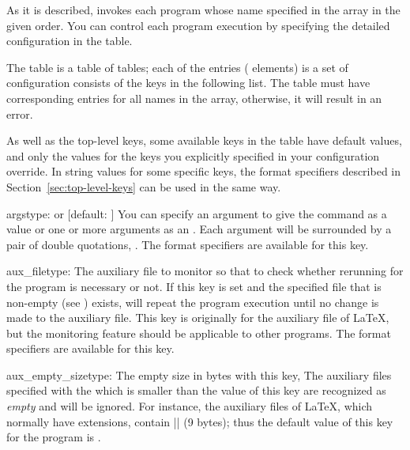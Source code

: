 \documentclass{llmk-doc}
\begin{document}
As it is described,  invokes each program whose name specified in
the  array in the given order. You can control each program
execution by specifying the detailed configuration in the 
table.

The  table is a table of tables; each of the entries (\aka
elements) is a set of configuration consists of the keys in the following list.
The  table must have corresponding entries for all names in the
 array, otherwise, it will result in an error.

As well as the top-level keys, some available keys in the  table
have default values, and only the values for the keys you explicitly specified
in your configuration override. In string values for some specific keys, the
format specifiers described in Section~\ref{sec:top-level-keys} can be used in
the same way.

\begin{confkey}{args}{type:  or }
  [default: \code{["\%T"]}]
You can specify an argument to give the command as a  value or one
or more arguments as an . Each argument will be
surrounded by a pair of double quotations, \eg {}. The format
specifiers are available for this key.
\end{confkey}

\begin{confkey}{aux\_file}{type: }
The auxiliary file to monitor so that to check whether rerunning for the
program is necessary or not. If this key is set and the specified file that is
non-empty (see ) exists,  will repeat the
program execution until no change is made to the auxiliary file. This key is
originally for the auxiliary file of {\LaTeX}, but the monitoring feature
should be applicable to other programs. The format specifiers are available
for this key.
\end{confkey}

\begin{confkey}{aux\_empty\_size}{type: }
The empty size in bytes with this key, The auxiliary files specified with the
 which is smaller than the value of this key are recognized as
\emph{empty} and will be ignored. For instance, the auxiliary files of {\LaTeX},
which normally have  extensions, contain
|\textvisiblespace{}| (9 bytes); thus the default
value of this key for the  program is .
\end{confkey}
\end{document}
